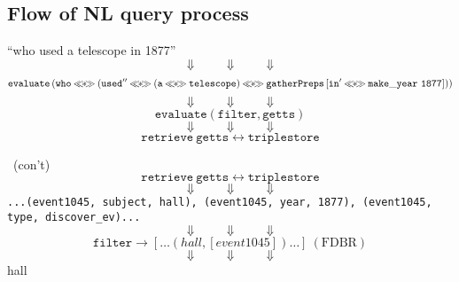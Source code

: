 \documentclass[logoontitle,tabu,supertabular,aspectratio=43]{preney-uwindsor-beamer}
\begin{document}
    \subsection{Flow of NL query process}
    \begin{frame}{\insertsubsection}
        \centering
        ``who used a telescope in 1877''
        \[\Downarrow \qquad \Downarrow \qquad \Downarrow \]
        \[ \mathtt{evaluate} \left( \mathtt{who} \biapply \left(\mathtt{used''} \biapply \left(\mathtt{a} \biapply \mathtt{telescope}\right) \biapply \mathtt{gatherPreps} \left[ \mathtt{in'} \biapply \mathtt{make\_year}\ \mathtt{1877}\right] \right)\right)  \]
        \[\Downarrow \qquad \Downarrow \qquad \Downarrow \]
        \[\mathtt{evaluate} \left(\mathtt{filter},\mathtt{getts}\right) \]
        \[\Downarrow \qquad \Downarrow \qquad \Downarrow \]
        \[\mathtt{retrieve}\ \mathtt{getts} \longleftrightarrow \mathtt{triplestore} \]

    \end{frame}

    \begin{frame}{\insertsubsection\ (con't)}
        \centering
        \[\mathtt{retrieve}\ \mathtt{getts} \longleftrightarrow \mathtt{triplestore} \]
        \[\Downarrow \qquad \Downarrow \qquad \Downarrow \]
        \texttt{...(event1045, subject, hall), (event1045, year, 1877), (event1045, type, discover\_ev)...}
        \[\Downarrow \qquad \Downarrow \qquad \Downarrow \]
        \[\mathtt{filter} \longrightarrow \left[\ldots\left(hall, \left[event1045\right]\right)\ldots\right]\ \mathrm{(FDBR)}\]
        \[\Downarrow \qquad \Downarrow \qquad \Downarrow \]
        hall
    \end{frame}

\end{document}
